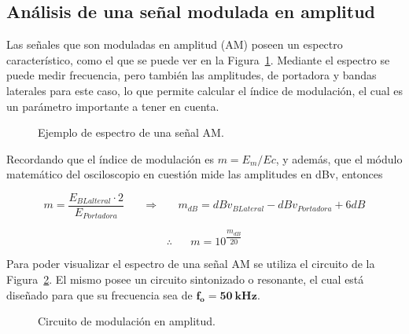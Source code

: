   \pagebreak
  \subsection{Análisis de una señal modulada en amplitud} \label{sec:Exp4_AM}
    Las señales que son moduladas en amplitud (AM) poseen un espectro característico, como el que se puede ver
    en la Figura~\ref{fig:EjemploEspectroModAM}. Mediante el espectro se puede medir frecuencia, pero también
    las amplitudes, de portadora y bandas laterales para este caso, lo que permite calcular el índice de modulación, el cual es
    un parámetro importante a tener en cuenta. 

    \begin{figure}[H]
      \centering
      \caption{Ejemplo de espectro de una señal AM.}
      \label{fig:EjemploEspectroModAM}
    \end{figure}

    Recordando que el índice de modulación es $m= E_m / Ec$, y además, que el módulo matemático del osciloscopio 
    en cuestión mide las amplitudes en dBv, entonces

    \begin{equation}
      m = \dfrac{E_{BLalteral} \cdot 2}{E_{Portadora}} \hspace{20pt}
      \Longrightarrow \hspace{20pt} m_{dB} = dBv_{BLateral} - dBv_{Portadora} + 6dB
      \label{eqn:IndiceModEndB}
    \end{equation}

    \begin{equation}
      \therefore \hspace{20pt} m=10^{\dfrac{m_{dB}}{20}}
      \label{eqn:IndiceMod}
    \end{equation}

    Para poder visualizar el espectro de una señal AM se utiliza el circuito de la Figura~\ref{fig:ModuladorAM}. 
    El mismo posee un circuito sintonizado o resonante, el cual está diseñado para que su
    frecuencia sea de $\mathbf{f_o = 50~kHz}$.

    \begin{figure}[H]
      \centering
      \caption{Circuito de modulación en amplitud.}
      \label{fig:ModuladorAM}
    \end{figure}

